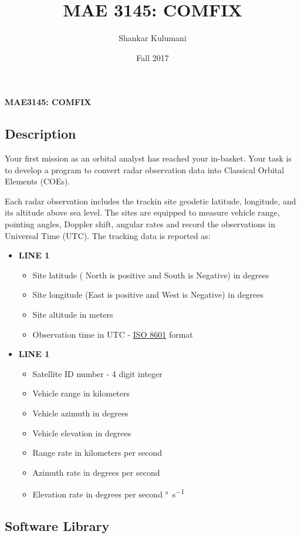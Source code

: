 \documentclass[11pt, reqno]{article}    %
\title{MAE 3145: COMFIX}
\author{Shankar Kulumani}
\date{Fall 2017}                          %
\begin{document}
\begin{center}
{\Large \textbf{MAE3145: COMFIX}}
\end{center}
\subsection*{Description}
Your first mission as an orbital analyst has reached your in-basket.
Your task is to develop a program to convert radar observation data into Classical Orbital Elements (COEs).

Each radar observation includes the trackin site geodetic latitude, longitude, and its altitude above sea level.
The sites are equipped to measure vehicle range, pointing angles, Doppler shift, angular rates and record the observations in Universal Time (UTC).
The tracking data is reported as:
\begin{itemize}
    \item \textbf{LINE 1}
        \begin{itemize}
            \item Site latitude ( North is positive and South is Negative) in degrees
            \item Site longitude (East is positive and West is Negative) in degrees
            \item Site altitude in meters
            \item Observation time in UTC - \href{https://en.wikipedia.org/wiki/ISO_8601}{ISO 8601} format
        \end{itemize}
    \item \textbf{LINE 1}
        \begin{itemize}
            \item Satellite ID number - 4 digit integer
            \item Vehicle range in kilometers
            \item Vehicle azimuth in degrees
            \item Vehicle elevation in degrees
            \item Range rate in kilometers per second
            \item Azimuth rate in degrees per second
            \item Elevation rate in degrees per second \si{\degree\per\second}
        \end{itemize}
\end{itemize}

\subsection*{Software Library}
\end{document}
